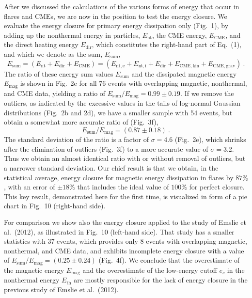 \documentclass[10pt,preprint]{aastex}  %
\begin{document}
After we discussed the calculations of the various forms of energy 
that occur in flares and CMEs, we are now in the position to test
the energy closure. We evaluate the energy closure for primary
energy dissipation only (Fig.~1), by adding up the nonthermal energy
in particles, $E_{\mathrm{nt}}$, the CME energy, $E_{\mathrm{CME}}$,
and the direct heating energy $E_{\mathrm{dir}}$,
which constitutes the right-hand part of Eq.~(1), and which we 
denote as the sum, $E_{\mathrm{sum}}$,
\begin{equation}
	E_{\mathrm{sum}} = 
	( E_{\mathrm{nt}} + 
	  E_{\mathrm{dir}} + E_{\mathrm{CME}} ) = 
	( E_{\mathrm{nt,e}} + E_{\mathrm{nt,i}} + 
	  E_{\mathrm{dir}} + 
          E_{\mathrm{CME,kin}} + E_{\mathrm{CME,grav}} ) \ .
\end{equation}
The ratio of these energy sum values $E_{\mathrm{sum}}$ and the dissipated
magnetic energy $E_{\mathrm{mag}}$ is shown in Fig.~2e for all 76 events
with overlapping magnetic, nonthermal, and CME data, yielding
a ratio of $E_{\mathrm{sum}} / E_{\mathrm{mag}} = 0.99 \pm 0.19$.
If we remove the outliers, as indicated by the excessive values in
the tails of log-normal Gaussian distributions (Fig.~2b and 2d),
we have a smaller sample with 54 events, but obtain a somewhat 
more accurate ratio of (Fig.~3f),
\begin{equation}
	E_{\mathrm{sum}} / E_{\mathrm{mag}} = (0.87 \pm 0.18) \ .
\end{equation}
The standard deviation of the ratio is a factor of $\sigma = 4.6$
(Fig.~2e), which shrinks after the elimination of outliers (Fig.~3f)
to a more accurate value of $\sigma = 3.2$. 
Thus we obtain an almost identical ratio with or without removal
of outliers, but a narrower standard deviation.
Our chief result is that we obtain, in the statistical average, 
energy closure for magnetic energy dissipation in flares by
$87\%$ , with an error of $\pm 18\%$ that includes the ideal
value of $100\%$ for perfect closure. This key result,
demonstrated here for the first time, is visualized
in form of a pie chart in Fig.~10 (right-hand side).

For comparison we show also the energy closure applied to the
study of Emslie et al.~(2012), as illustrated in Fig.~10 
(left-hand side).
That study has a smaller statistics
with 37 events, which provides only 8 events with overlapping
magnetic, nonthermal, and CME data, and
exhibits incomplete energy closure with a value of
$E_{\mathrm{sum}} / E_{\mathrm{mag}} = (0.25 \pm 0.24)$ (Fig.~4f).
We conclude that the overestimate of the magnetic energy 
$E_{\mathrm{mag}}$ and
the overestimate of the low-energy cutoff $e_c$ in the nonthermal energy
$E_{\mathrm{th}}$ are mostly responsible for the lack of energy closure
in the previous study of Emslie et al.~(2012).
\end{document}

